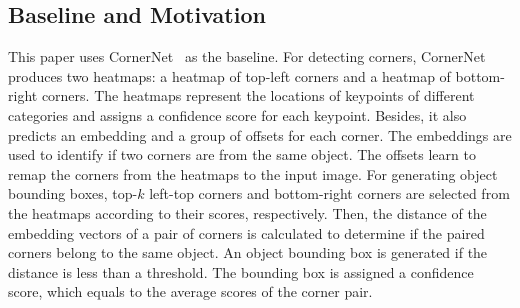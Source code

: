 \documentclass[10pt,twocolumn,letterpaper]{article}
\begin{document}
\subsection{Baseline and Motivation}\label{baseline}
This paper uses CornerNet~\cite{law2018cornernet} as the baseline. For detecting corners, CornerNet produces two heatmaps: a heatmap of top-left corners and a heatmap of bottom-right corners. The heatmaps represent the locations of keypoints of different categories and assigns a confidence score for each keypoint. Besides, it also predicts an embedding and a group of offsets for each corner. The embeddings are used to identify if two corners are from the same object. The offsets learn to remap the corners from the heatmaps to the input image. For generating object bounding boxes, top-$k$ left-top corners and bottom-right corners are selected from the heatmaps according to their scores, respectively. Then, the distance of the embedding vectors of a pair of corners is calculated to determine if the paired corners belong to the same object. An object bounding box is generated if the distance is less than a threshold. The bounding box is assigned a confidence score, which equals to the average scores of the corner pair. 
\begin{table}[tb]
\centering
{}
\vspace{-2ex}
\caption{False discovery rates ($\%$) of CornerNet. The false discovery rate reflects the distribution of incorrect bounding boxes. The results suggest the incorrect bounding boxes account for a large proportion.}
\label{FDR1}
\end{table}
\end{document}
